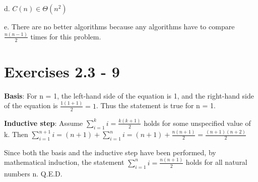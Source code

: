 \documentclass{article}
\begin{document}
d. $C(n)\in \Theta(n^2)$

e. There are no better algorithms because any algorithms have to compare $\frac{n(n-1)}{2}$ times for this problem.

\section{Exercises 2.3 - 9}

\textbf{Basis}: For n = 1, the left-hand side of the equation is 1, and the right-hand side of the equation is $\frac{1(1+1)}{2} = 1$. Thus the statement is true for n = 1.

\textbf{Inductive step}: Assume $\sum_{i=1}^{k}i = \frac{k(k+1)}{2}$ holds for some unspecified value of k. Then  $\sum_{i=1}^{n+1}i = (n+1) + \sum_{i=1}^{n}i = (n+1) + \frac{n(n+1)}{2} = \frac{(n+1)(n+2)}{2}$

 Since both the basis and the inductive step have been performed, by mathematical induction, the statement $\sum_{i=1}^{n}i = \frac{n(n+1)}{2}$ holds for all natural numbers n. Q.E.D.
\end{document}
